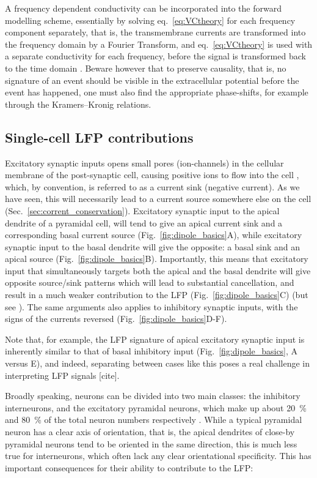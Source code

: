 \documentclass[preprint,11pt,authoryear]{elsarticle}
\begin{document}
 A frequency dependent conductivity can be incorporated into the forward modelling scheme, essentially by solving eq.~\ref{eq:VCtheory} for each frequency component separately, that is, the transmembrane currents are transformed into the frequency domain by a Fourier Transform, and eq.~\ref{eq:VCtheory} is used with a separate conductivity for each frequency, before the signal is transformed back to the time domain \citep{Tracey2011, Miceli2017}.
Beware however that to preserve causality, that is, no signature of an event should be visible in the extracellular potential before the event has happened, one must also find the appropriate phase-shifts, for example through the Kramers–Kronig relations\citep{Martinsen2008, Miceli2017}.

\subsection*{Single-cell LFP contributions}
Excitatory synaptic inputs opens small pores (ion-channels) in the cellular membrane of the post-synaptic cell, causing positive ions to flow into the cell \citep{Kandel2012}, which, by convention, is referred to as a current sink (negative current). As we have seen, this will necessarily lead to a current source somewhere else on the cell (Sec.~\ref{sec:corrent_conservation}).  
Excitatory synaptic input to the apical dendrite of a pyramidal cell, will tend to give an apical current sink and a corresponding basal current source (Fig.~\ref{fig:dipole_basics}A), while excitatory synaptic input to the basal dendrite will give the opposite: a basal sink and an apical source (Fig.~\ref{fig:dipole_basics}B). Importantly, this means that excitatory input that simultaneously targets both the apical and the basal dendrite will give opposite source/sink patterns which will lead to substantial cancellation, and result in a much weaker contribution to the LFP (Fig.~\ref{fig:dipole_basics}C) (but see \cite{Ness2018}).
The same arguments also applies to inhibitory synaptic inputs, with the signs of the currents reversed (Fig.~\ref{fig:dipole_basics}D-F). 

Note that, for example, the LFP signature of apical excitatory synaptic input is inherently similar to that of basal inhibitory input (Fig.~\ref{fig:dipole_basics}, A versus E), and indeed, separating between cases like this poses a real challenge in interpreting LFP signals [cite]. 

Broadly speaking, neurons can be divided into two main classes: the inhibitory interneurons, and the excitatory pyramidal neurons, which make up about 20~\% and 80~\% of the total neuron numbers respectively \citep{Kandel2012}. While a typical pyramidal neuron has a clear axis of orientation, that is, the apical dendrites of close-by pyramidal neurons tend to be oriented in the same direction, this is much less true for interneurons, which often lack any clear orientational specificity. This has important consequences for their ability to contribute to the LFP: 
\end{document}
